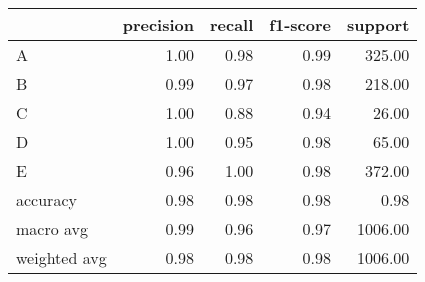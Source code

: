 \begin{tabular}{|l|r|r|r|r|}
\hline
{} &  precision &  recall &  f1-score &  support \\
\hline
A            &       1.00 &    0.98 &      0.99 &   325.00 \\
B            &       0.99 &    0.97 &      0.98 &   218.00 \\
C            &       1.00 &    0.88 &      0.94 &    26.00 \\
D            &       1.00 &    0.95 &      0.98 &    65.00 \\
E            &       0.96 &    1.00 &      0.98 &   372.00 \\
accuracy     &       0.98 &    0.98 &      0.98 &     0.98 \\
macro avg    &       0.99 &    0.96 &      0.97 &  1006.00 \\
weighted avg &       0.98 &    0.98 &      0.98 &  1006.00 \\
\hline
\end{tabular}
